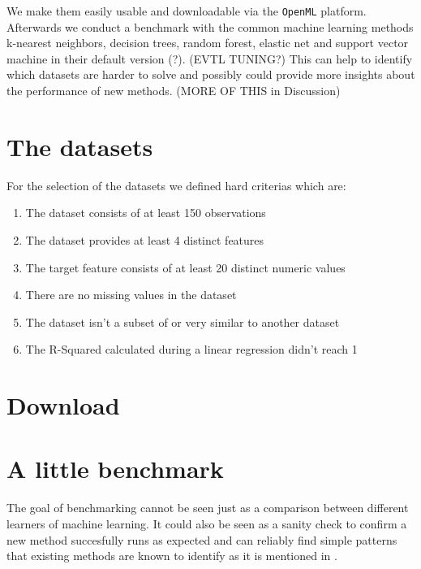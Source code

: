 \documentclass[a4paper]{article}
\begin{document}
We make them easily usable and downloadable via the \texttt{OpenML} platform.  
Afterwards we conduct a benchmark with the common machine learning methods k-nearest neighbors, decision trees, random forest, elastic net and support vector machine in their default version (?). (EVTL TUNING?) 
This can help to identify which datasets are harder to solve and possibly could provide more insights about the performance of new methods. (MORE OF THIS in Discussion)

  

\section{The datasets}

For the selection of the datasets we defined hard criterias which are: 
\begin{enumerate}
	\item The dataset consists of at least 150 observations 
	\item The dataset provides at least 4 distinct features 
	\item The target feature consists of at least 20 distinct numeric values 
	\item There are no missing values in the dataset 
	\item The dataset isn't a subset of or very similar to another dataset 
	\item The R-Squared calculated during a linear regression didn't reach 1
\end{enumerate}

\section{Download}

\section{A little benchmark}

The goal of benchmarking cannot be seen just as a comparison between different learners of machine learning.
It could also be seen as a sanity check to confirm a new method succesfully runs as expected and can reliably find simple patterns that existing methods are known to identify as it is mentioned in \citet{Hastie2009}. 
\end{document}
